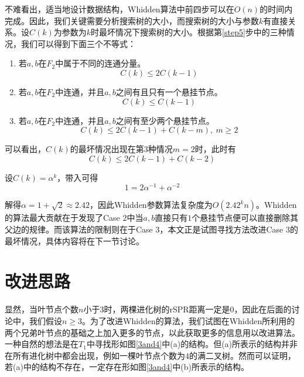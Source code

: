 不难看出，适当地设计数据结构，Whidden算法中前四步可以在$O(n)$的时间内完成。因此，我们关键需要分析搜索树的大小，而搜索树的大小与参数$k$有直接关系。设$C(k)$为参数为$k$时最坏情况下搜索树的大小。根据第\ref{step5}步中的三种情况，我们可以得到下面三个不等式：
\begin{enumerate}
	\item 若$a,b$在$F_2$中属于不同的连通分量。
	\begin{equation*}
		C(k) \le 2C(k-1)
	\end{equation*}
	\item 若$a,b$在$F_2$中连通，并且$a,b$之间有且只有一个悬挂节点。
	\begin{equation*}
		C(k) \le C(k-1)
	\end{equation*}
	\item 若$a,b$在$F_2$中连通，并且$a,b$之间有至少两个悬挂节点。
	\begin{equation*}
		C(k) \le 2C(k-1) + C(k-m),~m \ge 2
	\end{equation*}
\end{enumerate}

可以看出，$C(k)$的最坏情况出现在第3种情况$m = 2$时，此时有
\begin{equation*}
C(k) \le 2C(k-1) + C(k-2)
\end{equation*}

设$C(k)=\alpha ^ k$，带入可得
\begin{equation*}
 1 = 2 \alpha ^ {-1} + \alpha ^ {-2}
\end{equation*}

解得$\alpha = 1 + \sqrt{2} \approx 2.42$，因此Whidden参数算法复杂度为$O(2.42^kn)$。Whidden的算法最大贡献在于发现了Case 2中当$a,b$直接只有$1$个悬挂节点便可以直接删除其父边的规律。而该算法的限制则在于Case 3，本文正是试图寻找方法改进Case 3的最坏情况，具体内容将在下一节讨论。

\section{改进思路}
显然，当叶节点个数$n$小于$3$时，两棵进化树的rSPR距离一定是$0$，因此在后面的讨论中，我们假设$n \ge 3$。为了改进Whidden的算法，我们试图在Whidden所利用的两个兄弟叶节点的基础之上加入更多的节点，以此获取更多的信息用以改进算法。一种自然的想法是在$T_1$中寻找形如图\ref{3and4}中(a)的结构。但(a)所表示的结构并非在所有进化树中都会出现，例如一棵叶节点个数为$4$的满二叉树。然而可以证明，若(a)中的结构不存在，一定存在形如图\ref{3and4}中(b)所表示的结构。
\clearpage
{}

